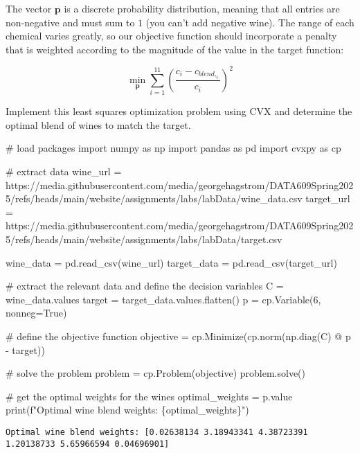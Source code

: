 \documentclass[
  letterpaper,
  DIV=11,
  numbers=noendperiod]{scrartcl}
\newenvironment{Shaded}{\begin{snugshade}}{\end{snugshade}}
\newcommand{\BuiltInTok}[1]{\textcolor[rgb]{0.00,0.23,0.31}{#1}}
\newcommand{\CommentTok}[1]{\textcolor[rgb]{0.37,0.37,0.37}{#1}}
\newcommand{\DecValTok}[1]{\textcolor[rgb]{0.68,0.00,0.00}{#1}}
\newcommand{\ImportTok}[1]{\textcolor[rgb]{0.00,0.46,0.62}{#1}}
\newcommand{\NormalTok}[1]{\textcolor[rgb]{0.00,0.23,0.31}{#1}}
\newcommand{\OperatorTok}[1]{\textcolor[rgb]{0.37,0.37,0.37}{#1}}
\newcommand{\SpecialCharTok}[1]{\textcolor[rgb]{0.37,0.37,0.37}{#1}}
\newcommand{\SpecialStringTok}[1]{\textcolor[rgb]{0.13,0.47,0.30}{#1}}
\newcommand{\StringTok}[1]{\textcolor[rgb]{0.13,0.47,0.30}{#1}}
\newcommand{\VariableTok}[1]{\textcolor[rgb]{0.07,0.07,0.07}{#1}}
\begin{document}
The vector \(\mathbf{p}\) is a discrete probability distribution,
meaning that all entries are non-negative and must sum to \(1\) (you
can't add negative wine). The range of each chemical varies greatly, so
our objective function should incorporate a penalty that is weighted
according to the magnitude of the value in the target function:

\[
\min_{\mathbf{p}} \sum_{i=1}^{11} \left(\frac{c_i-c_{blend,_i}}{c_i}\right)^2
\]

Implement this least squares optimization problem using CVX and
determine the optimal blend of wines to match the target.

\begin{Shaded}
\begin{Highlighting}[]
\CommentTok{\# load packages}
\ImportTok{import}\NormalTok{ numpy }\ImportTok{as}\NormalTok{ np}
\ImportTok{import}\NormalTok{ pandas }\ImportTok{as}\NormalTok{ pd}
\ImportTok{import}\NormalTok{ cvxpy }\ImportTok{as}\NormalTok{ cp}

\CommentTok{\# extract data}
\NormalTok{wine\_url }\OperatorTok{=} \StringTok{\textquotesingle{}https://media.githubusercontent.com/media/georgehagstrom/DATA609Spring2025/refs/heads/main/website/assignments/labs/labData/wine\_data.csv\textquotesingle{}}
\NormalTok{target\_url }\OperatorTok{=} \StringTok{\textquotesingle{}https://media.githubusercontent.com/media/georgehagstrom/DATA609Spring2025/refs/heads/main/website/assignments/labs/labData/target.csv\textquotesingle{}}

\NormalTok{wine\_data }\OperatorTok{=}\NormalTok{ pd.read\_csv(wine\_url)}
\NormalTok{target\_data }\OperatorTok{=}\NormalTok{ pd.read\_csv(target\_url)}

\CommentTok{\# extract the relevant data and define the decision variables}
\NormalTok{C }\OperatorTok{=}\NormalTok{ wine\_data.values}
\NormalTok{target }\OperatorTok{=}\NormalTok{ target\_data.values.flatten() }
\NormalTok{p }\OperatorTok{=}\NormalTok{ cp.Variable(}\DecValTok{6}\NormalTok{, nonneg}\OperatorTok{=}\VariableTok{True}\NormalTok{)}

\CommentTok{\# define the objective function}
\NormalTok{objective }\OperatorTok{=}\NormalTok{ cp.Minimize(cp.norm(np.diag(C) }\OperatorTok{@}\NormalTok{ p }\OperatorTok{{-}}\NormalTok{ target))}

\CommentTok{\# solve the problem}
\NormalTok{problem }\OperatorTok{=}\NormalTok{ cp.Problem(objective)}
\NormalTok{problem.solve()}

\CommentTok{\# get the optimal weights for the wines}
\NormalTok{optimal\_weights }\OperatorTok{=}\NormalTok{ p.value}
\BuiltInTok{print}\NormalTok{(}\SpecialStringTok{f"Optimal wine blend weights: }\SpecialCharTok{\{}\NormalTok{optimal\_weights}\SpecialCharTok{\}}\SpecialStringTok{"}\NormalTok{)}
\end{Highlighting}
\end{Shaded}

\begin{verbatim}
Optimal wine blend weights: [0.02638134 3.18943341 4.38723391 1.20138733 5.65966594 0.04696901]
\end{verbatim}
\end{document}
